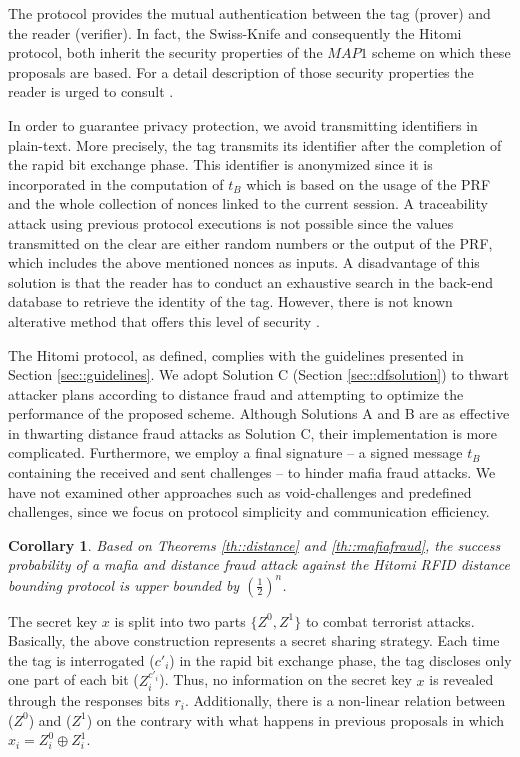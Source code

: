 \documentclass{article}
\newtheorem{corollary}{Corollary}
\begin{document}
The protocol provides the mutual authentication between the tag (prover) and the reader (verifier). In fact, the Swiss-Knife and consequently the Hitomi protocol, both inherit the security properties of the  $MAP1$ scheme \cite{188164,1062066} on which these proposals are based.  For a detail description of those security properties the reader is urged  to consult \cite{188164,1062066}.

In order to guarantee privacy protection, we avoid transmitting identifiers in plain-text. More precisely, the tag transmits its identifier after the completion of the rapid bit exchange phase. This identifier is anonymized since it is incorporated in the computation of $t_B$ which is  based on the usage of the PRF and the whole collection of nonces linked to the current session.  A traceability attack using previous protocol executions is not possible since the values transmitted on the clear are either random numbers or the output of the PRF, which includes the above mentioned nonces as inputs. A disadvantage of this solution is that the reader has to conduct an exhaustive search in the back-end database to retrieve the identity of the tag. However, there is not known alterative method that offers this level of security \cite{KimAKSP-2008-icisc}.

The Hitomi protocol, as defined,  complies with the guidelines presented in Section \ref{sec::guidelines}. We adopt Solution C (Section \ref{sec::dfsolution}) to thwart attacker plans according to distance fraud and attempting to optimize the performance of the proposed scheme. Although Solutions A and B are as effective in thwarting distance fraud attacks as Solution C,  their implementation is more complicated. Furthermore, we employ a final signature -- a signed message $t_B$ containing the received and sent challenges -- to hinder mafia fraud attacks. We have not examined other approaches such as void-challenges and predefined challenges, since we focus on protocol simplicity and communication efficiency.

\begin{corollary}
 Based on Theorems \ref{th::distance} and \ref{th::mafiafraud}, the success probability of a mafia and distance fraud attack against the Hitomi RFID distance bounding protocol is upper bounded by  $(\frac{1}{2})^n$.
\end{corollary}

The secret key $x$ is split into two parts $\{Z^0, Z^1\}$ to combat terrorist attacks.  Basically, the above construction represents a secret sharing strategy. Each time the tag is interrogated ($c'_i$) in the rapid bit exchange phase, the tag discloses only one part of each bit ($Z_i^{c'_i}$). Thus, no information on the secret key $x$ is revealed through the responses bits $r_i$.  Additionally, there is a non-linear relation between ($Z^0$) and ($Z^1$) on the contrary with what happens in previous proposals \cite{KimAKSP-2008-icisc,TuP-2007-rfidtechnology,reid2007} in which  $x_i = Z^0_i \oplus Z^1_i$.
\end{document}
